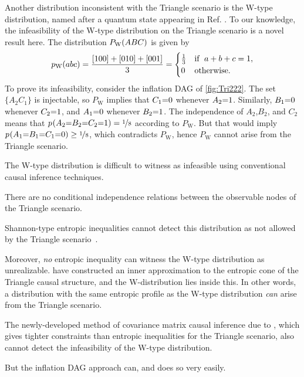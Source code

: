 \par\smallskip\nobreak
Another distribution inconsistent with the Triangle scenario is the W-type distribution, named after a quantum state appearing in Ref. \cite{3Qubits2Ways}. To our knowledge, the infeasibility of the W-type distribution on the Triangle scenario is a novel result here. The distribution $P_{\text{W}}\lparen A B C\rparen$ is given by
\begin{align}\label{eq:wdistribution1}
p_{\text{W}}\lparen a b c\rparen=\frac{[100]+[010]+[001]}{3}=\begin{cases}\tfrac{1}{3}&\text{if }\; a+b+c=1, \\ 0&\text{otherwise}.\end{cases}
\end{align}
To prove its infeasibility, consider the inflation DAG of \cref{fig:Tri222}. The set $\{A_2 C_1\}$ is injectable, so $P_{\text{W}}$ implies that $C_1\mathord{=} 0$ whenever $A_2 \mathord{=} 1$. Similarly, $B_1\mathord{=} 0$ whenever $C_2\mathord{=} 1$, and $A_1\mathord{=} 0$ whenever $B_2\mathord{=} 1$. The independence of $A_2$,$B_2$, and $C_2$ means that ${p_{}}\lparen A_2\mathord{=} B_2\mathord{=} C_2\mathord{=} 1\rparen=\nicefrac{1}{8}$ according to $P_{\text{W}}$. But that would imply ${p_{}}\lparen A_1\mathord{=} B_1\mathord{=} C_1\mathord{=} 0\rparen\geq\nicefrac{1}{8}$, which contradicts $P_{\text{W}}$, hence $P_{\text{W}}$ cannot arise from the Triangle scenario.

The W-type distribution is difficult to witness as infeasible using conventional causal inference techniques.
\begin{compactenum}
\item There are no conditional independence relations between the observable nodes of the Triangle scenario. %
\item Shannon-type entropic inequalities cannot detect this distribution as not allowed by the Triangle scenario~\cite{fritz2013marginal,chaves2014novel,chaves2014informationinference}. 
\item Moreover, \emph{no} entropic inequality can witness the W-type distribution as unrealizable. \citet{weilenmann2016entropic} have constructed an inner approximation to the entropic cone of the Triangle causal structure, and the W-distribution lies inside this. In other words, a distribution with the same entropic profile as the W-type distribution \emph{can} arise from the Triangle scenario.
\item The newly-developed method of covariance matrix causal inference due to \citet{kela2016covariance}, which gives tighter constraints than entropic inequalities for the Triangle scenario, also cannot detect the infeasibility of the W-type distribution.
\end{compactenum}
\par\noindent But the inflation DAG approach can, and does so very easily.


